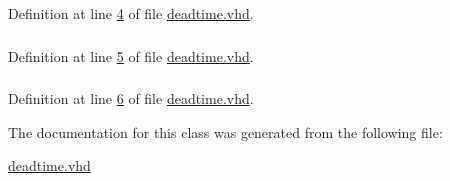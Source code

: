 Definition at line \hyperlink{deadtime_8vhd_source_l00004}{4} of file \hyperlink{deadtime_8vhd_source}{deadtime.\+vhd}.

\hypertarget{classdeadtime_a0f5ecc6613f63d07f7963a97b1b26095}{}
\subsubsection[{std\+\_\+logic\+\_\+arith}]{\hspace{0.3cm}{\ttfamily [Package]}}\label{classdeadtime_a0f5ecc6613f63d07f7963a97b1b26095}


Definition at line \hyperlink{deadtime_8vhd_source_l00005}{5} of file \hyperlink{deadtime_8vhd_source}{deadtime.\+vhd}.

\hypertarget{classdeadtime_a598da929e807d58939b47499e8bc9fa8}{}
\subsubsection[{std\+\_\+logic\+\_\+unsigned}]{\hspace{0.3cm}{\ttfamily [Package]}}\label{classdeadtime_a598da929e807d58939b47499e8bc9fa8}


Definition at line \hyperlink{deadtime_8vhd_source_l00006}{6} of file \hyperlink{deadtime_8vhd_source}{deadtime.\+vhd}.



The documentation for this class was generated from the following file\+:\begin{DoxyCompactItemize}
\item 
\hyperlink{deadtime_8vhd}{deadtime.\+vhd}\end{DoxyCompactItemize}
